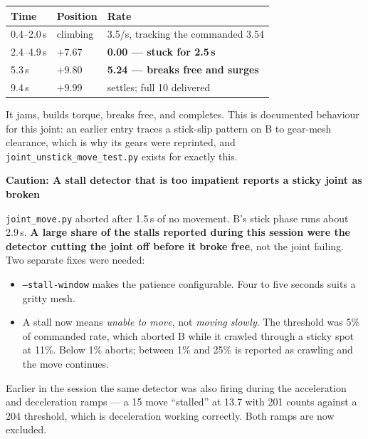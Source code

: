 \documentclass[11pt,letterpaper]{article}
\newenvironment{caution}[1]{%
    \par\addvspace{8pt}%
    \noindent{\color{cautionred}\rule{\linewidth}{0.8pt}}\par\vspace{2pt}
    \noindent\textbf{\color{cautionred}Caution: #1}\par\vspace{2pt}
}{%
    \par\vspace{2pt}\noindent{\color{cautionred}\rule{\linewidth}{0.4pt}}%
    \par\addvspace{8pt}%
}
\begin{document}
\begin{center}
\begin{tabular}{lll}
\toprule
\textbf{Time} & \textbf{Position} & \textbf{Rate} \\ \midrule
0.4--2.0\,s & climbing & 3.5\textdegree{}/s, tracking the commanded 3.54 \\
2.4--4.9\,s & $+7.67$\textdegree{} & \textbf{0.00 --- stuck for 2.5\,s} \\
5.3\,s & $+9.80$\textdegree{} & \textbf{5.24 --- breaks free and surges} \\
9.4\,s & $+9.99$\textdegree{} & settles; full 10\textdegree{} delivered \\
\bottomrule
\end{tabular}
\end{center}

It jams, builds torque, breaks free, and completes. This is documented
behaviour for this joint: an earlier entry traces a stick-slip pattern on B to
gear-mesh clearance, which is why its gears were reprinted, and
\texttt{joint\_unstick\_move\_test.py} exists for exactly this.

\begin{caution}{A stall detector that is too impatient reports a sticky joint as broken}
\texttt{joint\_move.py} aborted after 1.5\,s of no movement. B's stick phase
runs about 2.9\,s. \textbf{A large share of the stalls reported during this
session were the detector cutting the joint off before it broke free}, not the
joint failing. Two separate fixes were needed:

\begin{itemize}
    \item \texttt{--stall-window} makes the patience configurable. Four to five
    seconds suits a gritty mesh.
    \item A stall now means \emph{unable to move}, not \emph{moving slowly}.
    The threshold was 5\% of commanded rate, which aborted B while it crawled
    through a sticky spot at 11\%. Below 1\% aborts; between 1\% and 25\% is
    reported as crawling and the move continues.
\end{itemize}

Earlier in the session the same detector was also firing during the
acceleration and deceleration ramps --- a 15\textdegree{} move ``stalled'' at
13.7\textdegree{} with 201 counts against a 204 threshold, which is deceleration
working correctly. Both ramps are now excluded.
\end{caution}
\end{document}
